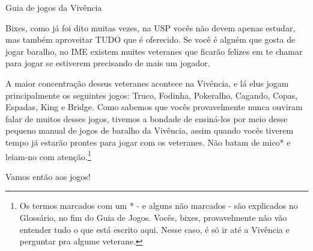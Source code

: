 \begin{secao}{Guia de jogos da Vivência}

Bixes, como já foi dito muitas vezes, na USP vocês não devem apenas estudar, mas
também aproveitar TUDO que é oferecido. Se você é alguém que gosta de jogar
baralho, no IME existem muites veteranes que ficarão felizes em te chamar para
jogar se estiverem precisando de mais um jogador.

A maior concentração dessus veteranes acontece na Vivência, e lá elus jogam
principalmente os seguintes jogos: Truco, Fodinha, Pokeralho, Cagando, Copas,
Espadas, King e Bridge. Como sabemos que vocês provavelmente nunca ouviram falar de
muitos desses jogos, tivemos a bondade de ensiná-los por meio desse pequeno manual
de jogos de baralho da Vivência, assim quando vocês tiverem tempo já estarão
prontes para jogar com os veteranes. Não batam de mico* e leiam-no com
atenção.\footnote{Os termos marcados com um * - e alguns não marcados - são
explicados no Glossário, no fim do Guia de Jogos. Vocês, bixes, provavelmente não
vão entender tudo o que está escrito aqui. Nesse caso, é só ir até a Vivência e
perguntar pra algume veterane.}

Vamos então aos jogos!











\end{secao}
